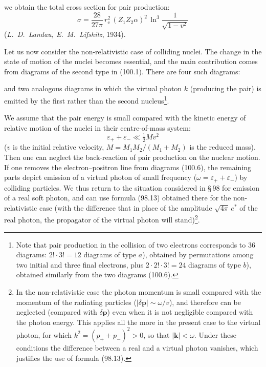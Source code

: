 \noindent we obtain the total cross section for pair production:
\begin{equation}
\sigma = \frac{28}{27\pi}\,r_\mathrm{e}^2\,(Z_1 Z_2 \alpha)^2\,\ln^3\frac{1}{\sqrt{1-v^2}}
\label{eq:100.5}
\end{equation}
(\emph{L.~D.~Landau, E.~M.~Lifshitz}, 1934).

Let us now consider the non-relativistic case of colliding nuclei. The change in the state of motion of the nuclei becomes essential, and the main contribution comes from diagrams of the second type in (100.1). There are four such diagrams:


\noindent and two analogous diagrams in which the virtual photon $k$ (producing the pair) is emitted by the first rather than the second nucleus\footnote{Note that pair production in the collision of two electrons corresponds to 36 diagrams: $2!\cdot 3! = 12$ diagrams of type $a$), obtained by permutations among two initial and three final electrons, plus $2\cdot 2!\cdot 3! = 24$ diagrams of type $b$), obtained similarly from the two diagrams (100.6).}.

We assume that the pair energy is small compared with the kinetic energy of relative motion of the nuclei in their centre-of-mass system:
\begin{equation}
\varepsilon_+ + \varepsilon_- \ll \tfrac{1}{2}Mv^2
\label{eq:100.7}
\end{equation}
($v$ is the initial relative velocity, $M = M_1 M_2/(M_1 + M_2)$ is the reduced mass). Then one can neglect the back-reaction of pair production on the nuclear motion. If one removes the electron--positron line from diagrams (100.6), the remaining parts depict emission of a virtual photon of small frequency ($\omega = \varepsilon_+ + \varepsilon_-$) by colliding particles. We thus return to the situation considered in \S\,98 for emission of a real soft photon, and can use formula (98.13) obtained there for the non-relativistic case (with the difference that in place of the amplitude $\sqrt{4\pi}\,e^*$ of the real photon, the propagator of the virtual photon will stand)\footnote{In the non-relativistic case the photon momentum is small compared with the momentum of the radiating particles ($|\delta\mathbf{p}| \sim \omega/v$), and therefore can be neglected (compared with $\delta\mathbf{p}$) even when it is not negligible compared with the photon energy. This applies all the more in the present case to the virtual photon, for which $k^2 = (p_+ + p_-)^2 > 0$, so that $|\mathbf{k}| < \omega$. Under these conditions the difference between a real and a virtual photon vanishes, which justifies the use of formula (98.13).}.

